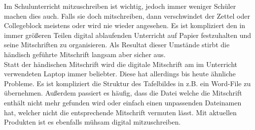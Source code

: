 
Im Schulunterricht mitzuschreiben ist wichtig, jedoch immer weniger Schüler machen dies auch. Falls sie doch mitschreiben, dann verschwindet der Zettel oder Collegeblock meistens oder wird nie wieder angesehen. Es ist kompliziert den in immer größeren Teilen digital ablaufenden Unterricht auf Papier festzuhalten und seine Mitschriften zu organisieren. Als Resultat dieser Umstände stirbt die händisch geführte Mitschrift langsam aber sicher aus. \\

Statt der händischen Mitschrift wird die digitale Mitschrift am im Unterricht verwendeten Laptop immer beliebter. Diese hat allerdings bis heute ähnliche Probleme. Es ist kompliziert die Struktur des Tafelbildes in z.B. ein Word-File zu übernehmen. Außerdem passiert es häufig, dass die Datei welche die Mitschrift enthält nicht mehr gefunden wird oder einfach einen unpassenden Dateinamen hat, welcher nicht die entsprechende Mitschrift vermuten lässt. Mit aktuellen Produkten ist es ebenfalls mühsam digital mitzuschreiben.